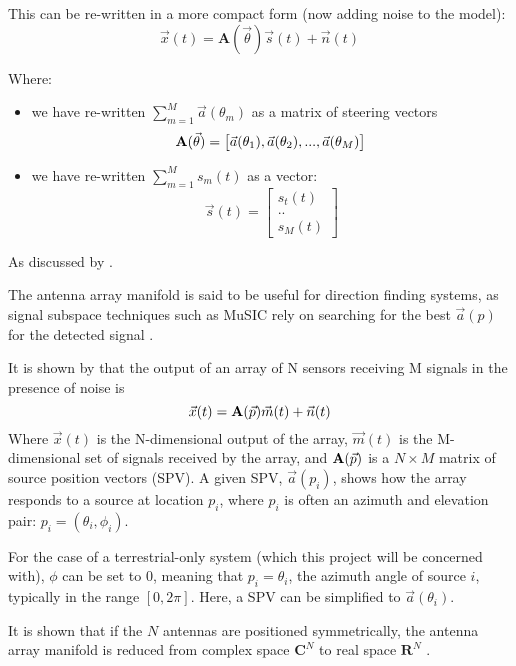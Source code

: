 This can be re-written in a more compact form (now adding noise to the model):
\begin{equation}
  \vec{x}(t) = \mathbf{A}(\vec{\theta})\vec{s}(t) + \vec{n}(t)
\end{equation}

Where:
\begin{itemize} 
  \item we have re-written \(\sum_{m=1}^{M}\vec{a}(\theta_m)\) as a matrix of steering vectors
\begin{equation} 
  \mathbf{A}(\vec{\theta}) = \begin{bmatrix} \vec{a}(\theta_1), \vec{a}(\theta_2), ..., \vec{a}(\theta_M) \end{bmatrix} \\
\end{equation}
  \item we have re-written  \(\sum_{m=1}^{M}s_m(t)\) as a vector:
\begin{equation}
  \vec{s}(t) = \begin{bmatrix} s_t(t) \\ .. \\ s_M(t) \end{bmatrix}
\end{equation}
\end{itemize}

As discussed by \cite{sleiman2000antenna} \cite{karimi1996manifold} \cite{dacos1995estimating}. 

The antenna array manifold is said to be useful for direction finding systems, as signal subspace techniques such as MuSIC rely on searching for the best \(\vec{a}(p)\) for the detected signal \cite{karimi1996manifold}. 

It is shown by \cite{dacos1995estimating} that the output of an array of N sensors receiving M signals in the presence of noise is
\begin{equation}
\vec{x}(t) = \mathbf{A}(\vec{p})\vec{m}(t) + \vec{n}(t)
\end{equation}
Where \(\vec{x}(t)\) is the N-dimensional output of the array, \(\vec{m}(t)\) is the M-dimensional set of signals received by the array, and \(\mathbf{A}(\vec{p})\) is a \(N \times M\) matrix of source position vectors (SPV). 
A given SPV, \(\vec{a}(p_i)\), shows how the array responds to a source at location \(p_i\), where \(p_i\) is often an azimuth and elevation pair: \(p_i = (\theta_i, \phi_i)\).

For the case of a terrestrial-only system (which this project will be concerned with), \(\phi\) can be set to 0, meaning that \(p_i = \theta_i\), the azimuth angle of source \(i\), typically in the range \([0, 2\pi]\). Here, a SPV can be simplified to \(\vec{a}(\theta_i)\).

It is shown that if the \(N\) antennas are positioned symmetrically, the antenna array manifold is reduced from complex space \(\mathbf{C}^N\) to real space \(\mathbf{R}^N\) \cite{dacos1995estimating}.
